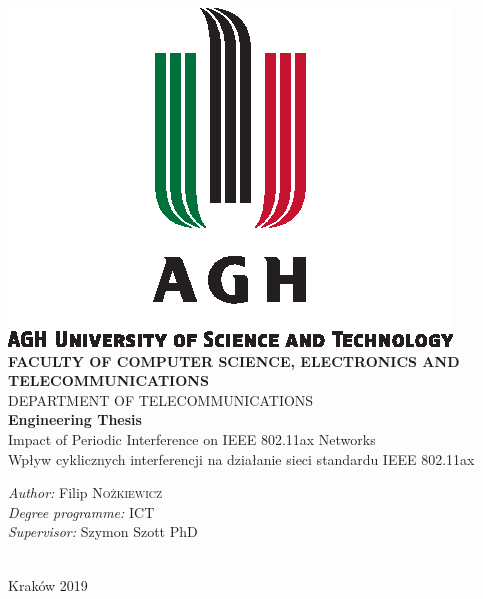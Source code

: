 \begin{titlepage}

\begin{center}

\includegraphics[scale=1.25]{agh_nzw_s_en_1w_wbr_pms}\\[0.2cm]

\textbf{\scriptsize  FACULTY OF COMPUTER SCIENCE,  ELECTRONICS AND TELECOMMUNICATIONS}\\[0.2cm]

\textsc{\scriptsize DEPARTMENT OF TELECOMMUNICATIONS}\\[1cm]

\textbf{\small Engineering Thesis}\\[1cm]

{\huge Impact of Periodic Interference on IEEE 802.11ax Networks}\\[0.5cm]
{\huge Wpływ cyklicznych interferencji na działanie sieci standardu IEEE 802.11ax}\\

\vfill

\begin{minipage}{0.8\textwidth}
\begin{flushleft}
{\large \emph{Author:} \hfill Filip \textsc{Nożkiewicz}}\\[0.1cm]
{\large \emph{Degree programme:} \hfill \textsc{ICT}}\\[0.1cm]
{\large \emph{Supervisor:} \hfill Szymon Szott PhD\textsc{}}
\end{flushleft}
\end{minipage}\\[2cm]

Kraków 2019

\end{center}

\end{titlepage}
